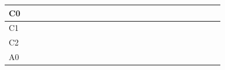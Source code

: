 \documentclass[journal,onecolumn]{IEEEtran}
\begin{document}
\begin{table}[ht]
\begin{tabular}{|l|llllll|llllll|llllll|llllll|}
C0   &                          &                          &                          & \cellcolor[HTML]{414868} & \cellcolor[HTML]{414868} & \cellcolor[HTML]{414868} &                          &                          &                          &                          &                          &                          &                          &                          &                          &                          &                          &                          &                          &                          &                          &                          &                          &  \\ \hline
C1   &                          &                          &                          &                          &                          &                          & \cellcolor[HTML]{414868} & \cellcolor[HTML]{414868} &                          &                          &                          &                          &                          &                          &                          &                          &                          &                          &                          &                          &                          &                          &                          &  \\ \hline
C2   &                          &                          &                          &                          &                          &                          &                          &                          & \cellcolor[HTML]{414868} & \cellcolor[HTML]{414868} &                          &                          &                          &                          &                          &                          &                          &                          &                          &                          &                          &                          &                          &  \\ \hline
A0   &                          &                          &                          &                          &                          &                          &                          &                          &                          & \cellcolor[HTML]{414868} &                          &                          &                          &                          &                          &                          &                          &                          &                          &                          &                          &                          &                          &  \\ \hline

\end{tabular}
\end{table}
\end{document}
